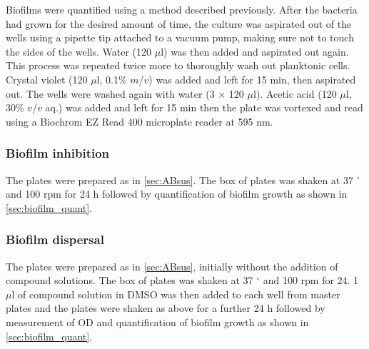 Biofilms were quantified using a method described previously\cite{OToole1998,Li2015a}.
After the bacteria had grown for the desired amount of time, the culture was aspirated out of the wells using a pipette tip attached to a vacuum pump, making sure not to touch the sides of the wells. Water (120 $\mu$l) was then added and aspirated out again. This process was repeated twice more to thoroughly wash out planktonic cells. Crystal violet (120 $\mu$l, 0.1\% $m$/$v$) was added and left for 15 min, then aspirated out. The wells were washed again with water (3 $\times$ 120 $\mu$l). Acetic acid (120 $\mu$l, 30\% $v$/$v$ aq.) was added and left for 15 min then the plate was vortexed and read using a Biochrom EZ Read 400 microplate reader at 595 nm.

\subsubsection{Biofilm inhibition}

The plates were prepared as in \ref{sec:ABsus}. The box of plates was shaken at 37 $^{\circ}$ and 100 rpm for 24 h followed by quantification of biofilm growth as shown in \ref{sec:biofilm_quant}.

\subsubsection{Biofilm dispersal \label{sec:disp}}

The plates were prepared as in \ref{sec:ABsus}, initially without the addition of compound solutions. The box of plates was shaken at 37 $^{\circ}$ and 100 rpm for 24.
1 $\mu$l of compound solution in DMSO was then added to each well from master plates and the plates were shaken as above for a further 24 h followed by measurement of OD and quantification of biofilm growth as shown in \ref{sec:biofilm_quant}.

